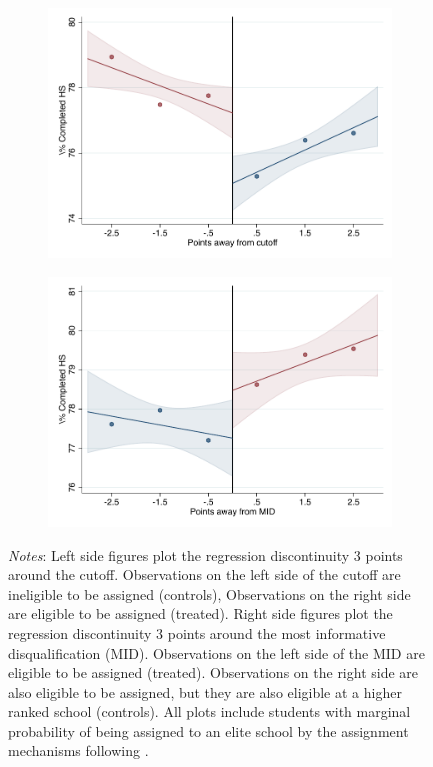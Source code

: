 \documentclass[oneside,11pt]{article}
\begin{document}
\begin{figure}[H]
\begin{center}
    \begin{subfigure}{0.475\textwidth}
        \centering
        \includegraphics[width=\textwidth]{04_Figures/rd_plot_tau_bachillerato_mas_IPN3.pdf}
    \end{subfigure}
    \begin{subfigure}{0.475\textwidth}
        \centering
        \includegraphics[width=\textwidth]{04_Figures/rd_plot_mid_bachillerato_mas_IPN3.pdf}
    \end{subfigure}
    \end{center}
    
\footnotesize
\textit{Notes}: Left side figures plot the regression discontinuity 3 points around the cutoff. Observations on the left side of the cutoff are ineligible to be assigned (controls), Observations on the right side are eligible to be assigned (treated). Right side figures plot the regression discontinuity 3 points around the most informative disqualification (MID). Observations on the left side of the MID are eligible to be assigned (treated). Observations on the right side are also eligible to be assigned, but they are also eligible at a higher ranked school (controls). All plots include students with marginal probability of being assigned to an elite school by the assignment mechanisms following \citet{abdulkadirouglu2022breaking}. 
\end{figure}
\end{document}
